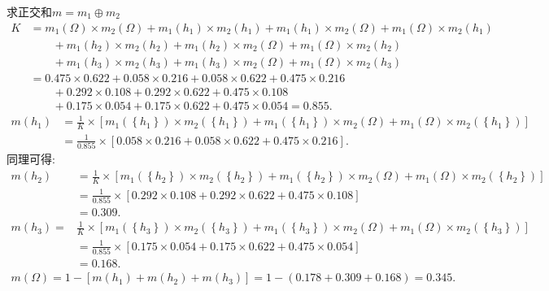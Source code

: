 求正交和$m=m_1\oplus m_2$
\begin{align*}
   K&=m_1(\Omega )\times m_2(\Omega )+m_1({h_1})\times m_2({h_1})+m_1({h_1})\times m_2(\Omega )+m_1(\Omega )\times m_2({h_1})\\
    &\quad\quad +m_1({h_2})\times m_2({h_2})+m_1({h_2})\times m_2(\Omega )+m_1(\Omega )\times m_2({h_2})\\
    &\quad\quad +m_1({h_3})\times m_2({h_3})+m_1({h_3})\times m_2(\Omega )+m_1(\Omega )\times m_2({h_3})\\
    &=0.475\times 0.622+0.058\times 0.216+0.058\times 0.622+0.475\times 0.216\\
    &\qquad +0.292\times 0.108+0.292\times 0.622+0.475\times 0.108\\
    &\qquad  +0.175\times 0.054+0.175\times 0.622+0.475\times 0.054 =0.855.
 \end{align*}
\begin{align*}
m\left(h_{1}\right) &=\frac{1}{K} \times\left[m_{1}\left(\left\{h_{1}\right\}\right) \times m_{2}\left(\left\{h_{1}\right\}\right)+m_{1}
       \left(\left\{h_{1}\right\}\right) \times m_{2}(\Omega)+m_{1}(\Omega) \times m_{2}\left(\left\{h_{1}\right\}\right)\right] \\
                    &=\frac{1}{0.855} \times[0.058 \times 0.216+0.058 \times 0.622+0.475 \times 0.216].
\end{align*}
同理可得:
\begin{align*}
m\left(h_{2}\right) &=\frac{1}{K} \times\left[m_{1}\left(\left\{h_{2}\right\}\right) \times m_{2}\left(\left\{h_{2}\right\}\right)+m_{1}\left(\left\{h_{2}\right\}\right) \times m_{2}(\Omega)+m_{1}(\Omega) \times m_{2}\left(\left\{h_{2}\right\}\right)\right] \\ &=\frac{1}{0.855} \times[0.292 \times 0.108+0.292 \times 0.622+0.475 \times 0.108] \\
                    &=0.309. \\
m\left(h_{3}\right)=& \frac{1}{K} \times\left[m_{1}\left(\left\{h_{3}\right\}\right) \times m_{2}\left(\left\{h_{3}\right\}\right)+m_{1}\left(\left\{h_{3}\right\}\right) \times m_{2}(\Omega)+m_{1}(\Omega) \times m_{2}\left(\left\{h_{3}\right\}\right)\right] \\ &=\frac{1}{0.855} \times[0.175 \times 0.054+0.175 \times 0.622+0.475 \times 0.054] \\
                    &=0.168.
\end{align*}
\begin{align*}
    m(\Omega )=1-[m({h_1})+m({h_2})+m{(h_3)}]=1-(0.178+0.309+0.168)=0.345.
\end{align*}

